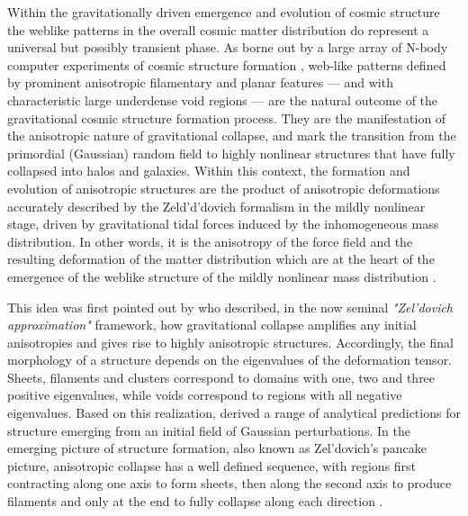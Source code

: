 Within the gravitationally driven emergence and evolution of cosmic structure the weblike patterns in the overall cosmic matter 
distribution do represent a universal but possibly transient phase. As borne out by a large array of N-body computer experiments 
of cosmic structure formation \citep[e.g.][]{Springel2005c, Vogelsberger2014,Schaye2015}, web-like patterns 
defined by prominent anisotropic filamentary and planar features --- and with characteristic large underdense void regions --- are the 
natural outcome of the gravitational cosmic structure formation process. They are the manifestation of the anisotropic nature of gravitational 
collapse, and mark the transition from the primordial (Gaussian) random field to highly nonlinear structures that have fully collapsed into halos 
and galaxies. 
Within this context, the formation and evolution of anisotropic structures are the product of anisotropic deformations accurately described by the Zeld'd'dovich formalism in the mildly nonlinear stage, driven by gravitational tidal forces induced by the inhomogeneous mass distribution.
%
 In other words, it is the anisotropy of the force field and the resulting deformation of 
the matter distribution which are at the heart of the emergence of the weblike structure of the mildly nonlinear mass distribution \citep[also see][]{Bond1996}.

This idea was first pointed out by \citet[][also see \citealt{Shandarin1989}]{Zeldovich1970} who described, in the now seminal \emph{"Zel'dovich approximation"} framework, how gravitational collapse amplifies any initial anisotropies and gives rise to 
highly anisotropic structures. Accordingly, the final morphology of a structure depends on 
the eigenvalues of the deformation tensor.  Sheets, filaments and clusters correspond to domains with one, two and three positive 
eigenvalues, while voids correspond to regions with all negative eigenvalues. Based on this realization, \cite{Doroshkevich1970} derived 
a range of analytical predictions for structure emerging from an initial field of Gaussian perturbations. In the emerging picture of 
structure formation, also known as Zel'dovich's pancake picture, anisotropic collapse has a well defined sequence, with regions first 
contracting along one axis to form sheets, then along the second axis to produce filaments and only at the end to fully collapse along 
each direction \citep{Shandarin1989,Shandarin2009}. 

